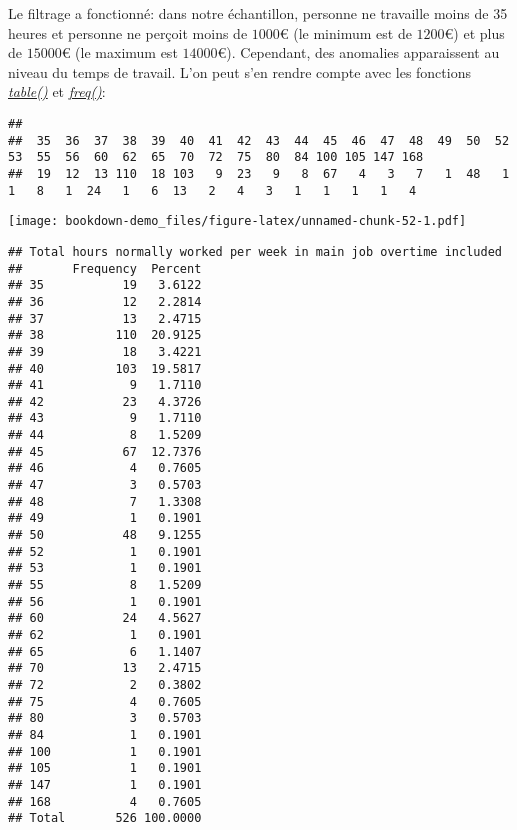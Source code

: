 \documentclass[
]{book}
\newenvironment{Shaded}{\begin{snugshade}}{\end{snugshade}}
\newcommand{\FunctionTok}[1]{\textcolor[rgb]{0.00,0.00,0.00}{#1}}
\newcommand{\NormalTok}[1]{#1}
\newcommand{\SpecialCharTok}[1]{\textcolor[rgb]{0.00,0.00,0.00}{#1}}
\begin{document}
Le filtrage a fonctionné: dans notre échantillon, personne ne travaille moins de 35 heures et personne ne perçoit moins de \(1000€\) (le minimum est de \(1200€\)) et plus de \(15000€\) (le maximum est \(14000€\)). Cependant, des anomalies apparaissent au niveau du temps de travail. L'on peut s'en rendre compte avec les fonctions \href{https://www.rdocumentation.org/packages/base/versions/3.6.2/topics/table}{\emph{table()}} et \href{https://www.rdocumentation.org/packages/descr/versions/1.1.5/topics/freq}{\emph{freq()}}:

\begin{Shaded}
\end{Shaded}

\begin{verbatim}
## 
##  35  36  37  38  39  40  41  42  43  44  45  46  47  48  49  50  52  53  55  56  60  62  65  70  72  75  80  84 100 105 147 168 
##  19  12  13 110  18 103   9  23   9   8  67   4   3   7   1  48   1   1   8   1  24   1   6  13   2   4   3   1   1   1   1   4
\end{verbatim}

\begin{Shaded}
\end{Shaded}

\texttt{[image: bookdown-demo\_files/figure-latex/unnamed-chunk-52-1.pdf]}

\begin{verbatim}
## Total hours normally worked per week in main job overtime included 
##       Frequency  Percent
## 35           19   3.6122
## 36           12   2.2814
## 37           13   2.4715
## 38          110  20.9125
## 39           18   3.4221
## 40          103  19.5817
## 41            9   1.7110
## 42           23   4.3726
## 43            9   1.7110
## 44            8   1.5209
## 45           67  12.7376
## 46            4   0.7605
## 47            3   0.5703
## 48            7   1.3308
## 49            1   0.1901
## 50           48   9.1255
## 52            1   0.1901
## 53            1   0.1901
## 55            8   1.5209
## 56            1   0.1901
## 60           24   4.5627
## 62            1   0.1901
## 65            6   1.1407
## 70           13   2.4715
## 72            2   0.3802
## 75            4   0.7605
## 80            3   0.5703
## 84            1   0.1901
## 100           1   0.1901
## 105           1   0.1901
## 147           1   0.1901
## 168           4   0.7605
## Total       526 100.0000
\end{verbatim}
\end{document}
